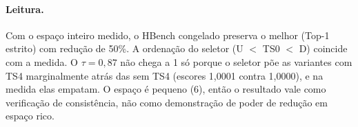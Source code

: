 \paragraph{Leitura.} Com o espaço inteiro medido, o HBench congelado preserva o melhor (Top-1 estrito) com redução de 50\%. A ordenação do seletor (U $<$ TS0 $<$ D) coincide com a medida. O $\tau=0{,}87$ não chega a 1 só porque o seletor põe as variantes com TS4 marginalmente atrás das sem TS4 (escores 1,0001 contra 1,0000), e na medida elas empatam. O espaço é pequeno (6), então o resultado vale como verificação de consistência, não como demonstração de poder de redução em espaço rico.
